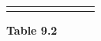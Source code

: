 {\begin{center}
\begin{xtabular*}{\mytablewidth}[t]{|p{10\mystarwidth}|p{10\mystarwidth}|p{10\mystarwidth}|p{10\mystarwidth}|p{10\mystarwidth}|p{10\mystarwidth}|p{10\mystarwidth}|p{10\mystarwidth}|}
         &
    
    
         &
    
    
         &
    
    
         &
    
    
         &
    
    
     \tabularnewline{}
    \end{xtabular*}
      \end{center}
    \begin{center}{\small\bfseries Table 9.2}\end{center}
    
    \addtocounter{footnote}{-0}
    
        }%
      
    \par
  
      
      
    
